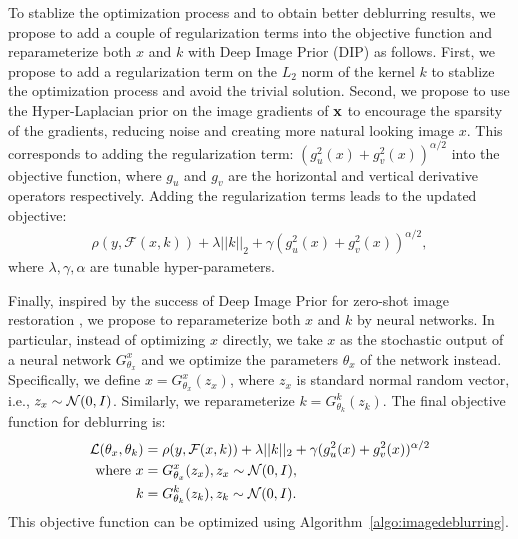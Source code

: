 \documentclass[final]{cvpr}
\newcommand{\Aref}[1]{Algorithm~\ref{#1}}
\begin{document}
To stablize the optimization process and to obtain better deblurring results, we propose to add a couple of regularization terms into the objective function and reparameterize both $x$ and $k$ with Deep Image Prior (DIP) \cite{ulyanov2018deep} as follows. First, we propose to add a regularization term on the $L_2$ norm of the kernel $k$ to stablize the optimization process and avoid the trivial solution. Second, we propose to 
use the Hyper-Laplacian prior \cite{krishnan2009fast} on the image gradients of ${\bf x}$ to encourage the sparsity of the gradients, reducing noise and creating more natural looking image $x$. This corresponds to adding the regularization term: $(g_u^2(x) + g_v^2(x))^{\alpha/2}$ into the objective function, where $g_u$ and $g_v$ are the horizontal and vertical derivative operators respectively. Adding the regularization terms leads to the updated objective: 
\begin{align}
    \rho(y, \mathcal{F}(x, k)) + \lambda||k||_2 + \gamma (g_u^2(x) + g_v^2(x))^{\alpha/2}, 
\end{align}
where $\lambda, \gamma, \alpha$ are tunable hyper-parameters. 

Finally, inspired by the success of Deep Image Prior \cite{ulyanov2018deep} for zero-shot image restoration \cite{ulyanov2018deep,ren2020neural,gandelsman2019double,liu2019image}, we propose to reparameterize both $x$ and $k$ by neural networks. In particular, instead of optimizing $x$ directly, we take $x$
as the stochastic output of a neural network $G_{\theta_x}^x$ and we optimize the parameters $\theta_x$ of the network instead. Specifically, we define $x = G^{x}_{\theta_x}(z_x)$, where $z_x$ is standard normal random vector, i.e., $z_x \sim \mathcal{N}(0, I)$. Similarly, we reparameterize $k = G^{k}_{\theta_k}(z_k)$. The final objective function for deblurring is: 
\begin{align}
    \mathcal{L}(\theta_x, \theta_k)&=\rho(y, \mathcal{F}(x, k)) + \lambda||k||_2 + \gamma (g_u^2(x) + g_v^2(x))^{\alpha/2} \nonumber \\
    \textrm{where }   x &= G^{x}_{\theta_x}(z_x), z_x \sim \mathcal{N}(0,I), \\
      k &= G^{k}_{\theta_k}(z_k), z_k \sim \mathcal{N}(0,I).
\end{align}
This objective function can be optimized using \Aref{algo:imagedeblurring}. 


\end{document}
